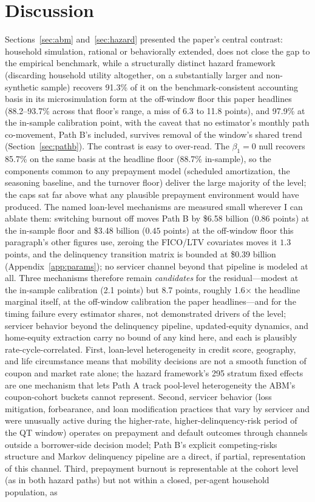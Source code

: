 \documentclass[12pt]{article}
\begin{document}
\section{Discussion}\label{sec:discussion}

Sections~\ref{sec:abm} and~\ref{sec:hazard} presented the paper's central contrast: household simulation, rational or behaviorally extended, does not close the gap to the empirical benchmark, while a structurally distinct hazard framework (discarding household utility altogether, on a substantially larger and non-synthetic sample) recovers 91.3\% of it on the benchmark-consistent accounting basis in its microsimulation form at the off-window floor this paper headlines (88.2--93.7\% across that floor's range, a miss of 6.3 to 11.8 points), and 97.9\% at the in-sample calibration point, with the caveat that no estimator's monthly path co-movement, Path B's included, survives removal of the window's shared trend (Section~\ref{sec:pathb}). The contrast is easy to over-read. The $\beta_1 = 0$ null recovers 85.7\% on the same basis at the headline floor (88.7\% in-sample), so the components common to any prepayment model (scheduled amortization, the seasoning baseline, and the turnover floor) deliver the large majority of the level; the caps sat far above what any plausible prepayment environment would have produced. The named loan-level mechanisms are measured small wherever I can ablate them: switching burnout off moves Path B by \$6.58 billion ($0.86$ points) at the in-sample floor and \$3.48 billion ($0.45$ points) at the off-window floor this paragraph's other figures use, zeroing the FICO/LTV covariates moves it $1.3$ points, and the delinquency transition matrix is bounded at \$0.39 billion (Appendix~\ref{app:params}); no servicer channel beyond that pipeline is modeled at all. Three mechanisms therefore remain \emph{candidates} for the residual---modest at the in-sample calibration (2.1 points) but 8.7 points, roughly 1.6$\times$ the headline marginal itself, at the off-window calibration the paper headlines---and for the timing failure every estimator shares, not demonstrated drivers of the level; servicer behavior beyond the delinquency pipeline, updated-equity dynamics, and home-equity extraction carry no bound of any kind here, and each is plausibly rate-cycle-correlated. First, loan-level heterogeneity in credit score, geography, and life circumstance means that mobility decisions are not a smooth function of coupon and market rate alone; the hazard framework's 295 stratum fixed effects are one mechanism that lets Path A track pool-level heterogeneity the ABM's coupon-cohort buckets cannot represent. Second, servicer behavior (loss mitigation, forbearance, and loan modification practices that vary by servicer and were unusually active during the higher-rate, higher-delinquency-risk period of the QT window) operates on prepayment and default outcomes through channels outside a borrower-side decision model; Path B's explicit competing-risks structure and Markov delinquency pipeline are a direct, if partial, representation of this channel. Third, prepayment burnout is representable at the cohort level (as in both hazard paths) but not within a closed, per-agent household population, as 
\end{document}
